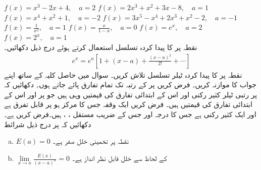 $f(x)=x^3-2x+4,\quad a=2$
$f(x)=2x^3+x^2+3x-8,\quad a=1$
$f(x)=x^4+x^2+1,\quad a=-2$
$f(x)=3x^5-x^4+2x^3+x^2-2,\quad a=-1$
$f(x)=\frac{1}{x^2},\quad a=1$
$f(x)=\frac{x}{1-x},\quad a=0$
$f(x)=e^x,\quad a=2$
$f(x)=2^x,\quad a=1$
\\
نقطہ  پر  کا پیدا کردہ تسلسل استعمال کرتے ہوئے درج ذیل دکھائیں۔
\begin{align*} 
e^x=e^a[1+(x-a)+\frac{(x-a)^2}{2!}+\cdots]
\end{align*}
نقطہ  پر  کا پیدا کردہ ٹیلر تسلسل تلاش کریں۔  سوال   میں حاصل کلیہ کے ساتھ اپنے جواب کا موازنہ کریں۔
فرض کریں  پر  کے  رتبہ تک تمام تفارق پائے جاتے ہوں۔ دکھائیں کہ  پر  رتبی ٹیلر کثیر رکنی اور اس کے ابتدائی  تفارق کی قیمتیں وہی ہیں جو  پر  اور اس کے ابتدائی  تفارق کی قیمتیں ہیں۔ 
 فرض کریں  ایک وقفہ  جس کا مرکز  ہو پر قابل تفرق ہے اور  ایک کثیر رکنی ہے جس کا درجہ   اور جس کے  ضریب  مستقل ، ،  ہیں۔فرض  کریں  ہے۔ دکھائیں کہ  پر درج ذیل شرائط
\begin{enumerate}[a.]
\item
$E(a)=0$\quad\quad
نقطہ  پر تخمینی خلل صفر ہے۔
\item
$\lim\limits_{x\to a}\frac{E(x)}{(x-a)^n}=0$\quad\quad
{} کے لحاظ سے خلل قابل نظر انداز ہے۔
\end{enumerate}
